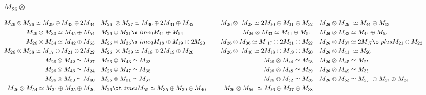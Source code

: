 \subsubsection{$M_26\otimes -$}
\begin{align*}
M_{26} \otimes M_{26} \simeq M_{29} \oplus M_{33} \oplus 2 M_{34} &&& M_{26} \
\otimes M_{27} \simeq M_{30} \oplus 2 M_{31} \oplus M_{32} &&& M_{26} \otimes \
M_{28} \simeq 2 M_{30} \oplus M_{31} \oplus M_{32} &&& M_{26} \otimes M_{29} \
\simeq M_{44} \oplus M_{53}\\
M_{26} \otimes M_{30} \simeq M_{45} \oplus M_{54} &&& M_{26} \otimes M_{31} \s\
imeq M_{41} \oplus M_{54} &&& M_{26} \otimes M_{32} \simeq M_{46} \oplus M_{54\
} &&& M_{26} \otimes M_{33} \simeq M_{43} \oplus M_{53}\\
M_{26} \otimes M_{34} \simeq M_{42} \oplus M_{53} &&& M_{26} \otimes M_{35} \s\
imeq M_{18} \oplus M_{19} \oplus 2 M_{20} &&& M_{26} \otimes M_{36} \simeq M_{\
17} \oplus 2 M_{21} \oplus M_{22} &&& M_{26} \otimes M_{37} \simeq 2 M_{17} \o\
plus M_{21} \oplus M_{22}\\
M_{26} \otimes M_{38} \simeq M_{17} \oplus M_{21} \oplus 2 M_{22} &&& M_{26} \
\otimes M_{39} \simeq M_{18} \oplus 2 M_{19} \oplus M_{20} &&& M_{26} \otimes \
M_{40} \simeq 2 M_{18} \oplus M_{19} \oplus M_{20} &&& M_{26} \otimes M_{41} \
\simeq M_{26}\\
M_{26} \otimes M_{42} \simeq M_{27} &&& M_{26} \otimes M_{43} \simeq M_{23} &&\
& M_{26} \otimes M_{44} \simeq M_{28} &&& M_{26} \otimes M_{45} \simeq M_{25}\
\\
M_{26} \otimes M_{46} \simeq M_{24} &&& M_{26} \otimes M_{47} \simeq M_{38} &&\
& M_{26} \otimes M_{48} \simeq M_{39} &&& M_{26} \otimes M_{49} \simeq M_{35}\
\\
M_{26} \otimes M_{50} \simeq M_{40} &&& M_{26} \otimes M_{51} \simeq M_{37} &&\
& M_{26} \otimes M_{52} \simeq M_{36} &&& M_{26} \otimes M_{53} \simeq M_{23} \
\oplus M_{27} \oplus M_{28}\\
M_{26} \otimes M_{54} \simeq M_{24} \oplus M_{25} \oplus M_{26} &&& M_{26} \ot\
imes M_{55} \simeq M_{35} \oplus M_{39} \oplus M_{40} &&& M_{26} \otimes M_{56\
} \simeq M_{36} \oplus M_{37} \oplus M_{38}\\
\end{align*}

